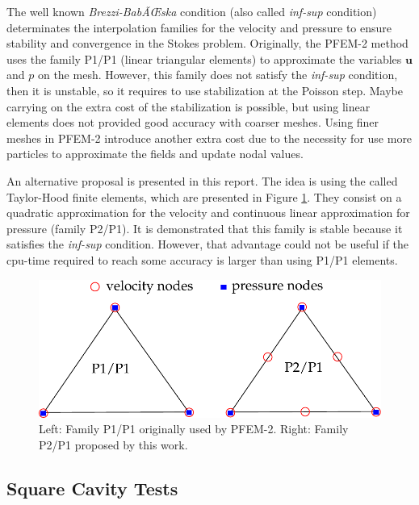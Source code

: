 \documentclass[a4paper,conference]{IEEEtran}
\begin{document}
The well known \textit{Brezzi-BabÃŒska} condition (also called \textit{inf-sup} condition) determinates the interpolation families for the velocity and pressure to ensure stability and convergence in the Stokes problem. Originally, the PFEM-2 method uses the family P1/P1 (linear triangular elements) to approximate the variables $\mathbf{u}$ and $p$ on the mesh\cite{Idelsohn12b}. %
However, this family does not satisfy the \textit{inf-sup} condition, then it is unstable, so it requires to use stabilization at the Poisson step. Maybe carrying on the extra cost of the stabilization is possible, but using linear elements does not provided good accuracy with coarser meshes. Using finer meshes in PFEM-2 introduce another extra cost due to the necessity for use more particles to approximate the fields and update nodal values.

An alternative proposal is presented in this report. The idea is using the called Taylor-Hood finite elements\cite{HoodTaylor73}, which are presented in Figure \ref{fg:taylor-hood}. They consist on a quadratic approximation for the velocity and continuous linear approximation for pressure (family P2/P1). It is demonstrated that this family is stable because it satisfies the \textit{inf-sup} condition. However, that advantage could not be useful if the cpu-time required to reach some accuracy is larger than using P1/P1 elements.

\begin{figure}[htbp]
  \begin{center}
      \includegraphics[width=.9\columnwidth]{images/taylor_hood.pdf}
  \end{center}
  \caption{\label{fg:taylor-hood} Left: Family P1/P1 originally used by PFEM-2. Right: Family P2/P1 proposed by this work.}
\end{figure}

\subsection{Square Cavity Tests}
\end{document}
